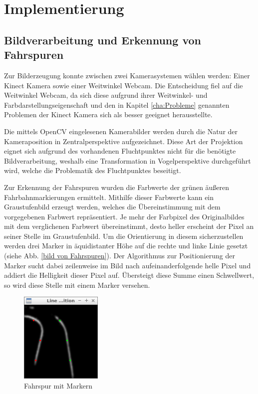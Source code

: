 \chapter{Implementierung}
\label{cha:Implementierung}
\section{Bildverarbeitung und Erkennung von Fahrspuren}
\label{sec:spurerkennung}

Zur Bilderzeugung konnte zwischen zwei Kamerasystemen wählen werden: Einer Kinect Kamera sowie einer Weitwinkel Webcam. Die Entscheidung fiel auf die Weitwinkel Webcam, da sich diese aufgrund ihrer Weitwinkel- und Farbdarstellungseigenschaft und den in Kapitel \ref{cha:Probleme} genannten Problemen der Kinect Kamera sich als besser geeignet herausstellte. 

Die mittels OpenCV eingelesenen Kamerabilder werden durch die Natur der Kameraposition in Zentralperspektive aufgezeichnet. Diese Art der Projektion eignet sich aufgrund des vorhandenen Fluchtpunktes nicht für die benötigte Bildverarbeitung, weshalb eine Transformation in Vogelperspektive durchgeführt wird, welche die Problematik des Fluchtpunktes beseitigt.

Zur Erkennung der Fahrspuren wurden die Farbwerte der grünen äußeren Fahrbahnmarkierungen ermittelt. Mithilfe dieser Farbwerte kann ein Graustufenbild erzeugt werden, welches die Übereinstimmung mit dem vorgegebenen Farbwert repräsentiert. Je mehr der Farbpixel des Originalbildes mit dem verglichenen Farbwert übereinstimmt, desto heller erscheint der Pixel an seiner Stelle im Graustufenbild. Um die Orientierung in diesem sicherzustellen werden drei Marker in äquidistanter Höhe auf die rechte und linke Linie gesetzt (siehe Abb. \ref{bild von Fahrspuren}). Der Algorithmus zur Positionierung der Marker sucht dabei zeilenweise im Bild nach aufeinanderfolgende helle Pixel und addiert die Helligkeit dieser Pixel auf. Übersteigt diese Summe einen Schwellwert, so wird diese Stelle mit einem Marker versehen.

\begin{figure}[ht]
	\centering
	\includegraphics[width=0.35\textwidth]{images/isnt_straight_original.png}
	\caption{Fahrspur mit Markern}
\end{figure}
\label{Bild von Fahrspuren}

